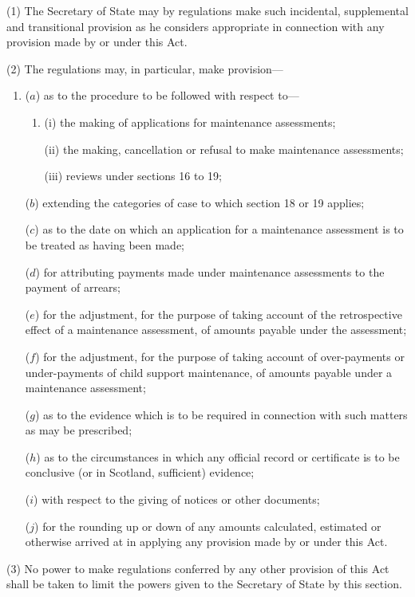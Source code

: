\documentclass[12pt,a4paper]{article}
\begin{document}
(1) The Secretary of State may by regulations make such incidental, supplemental and transitional provision as he considers appropriate in connection with any provision made by or under this Act.

(2) The regulations may, in particular, make provision—
\begin{enumerate}\item[]
($a$) as to the procedure to be followed with respect to—
\begin{enumerate}\item[]
(i) the making of applications for maintenance assessments;

(ii) the making, cancellation or refusal to make maintenance assessments;

(iii) reviews under sections 16 to 19;
\end{enumerate}

($b$) extending the categories of case to which section 18 or 19 applies;

($c$) as to the date on which an application for a maintenance assessment is to be treated as having been made;

($d$) for attributing payments made under maintenance assessments to the payment of arrears;

($e$) for the adjustment, for the purpose of taking account of the retrospective effect of a maintenance assessment, of amounts payable under the assessment;

($f$) for the adjustment, for the purpose of taking account of over-payments or under-payments of child support maintenance, of amounts payable under a maintenance assessment;

($g$) as to the evidence which is to be required in connection with such matters as may be prescribed;

($h$) as to the circumstances in which any official record or certificate is to be conclusive (or in Scotland, sufficient) evidence;

($i$) with respect to the giving of notices or other documents;

($j$) for the rounding up or down of any amounts calculated, estimated or otherwise arrived at in applying any provision made by or under this Act.
\end{enumerate}

(3) No power to make regulations conferred by any other provision of this Act shall be taken to limit the powers given to the Secretary of State by this section.
\end{document}
